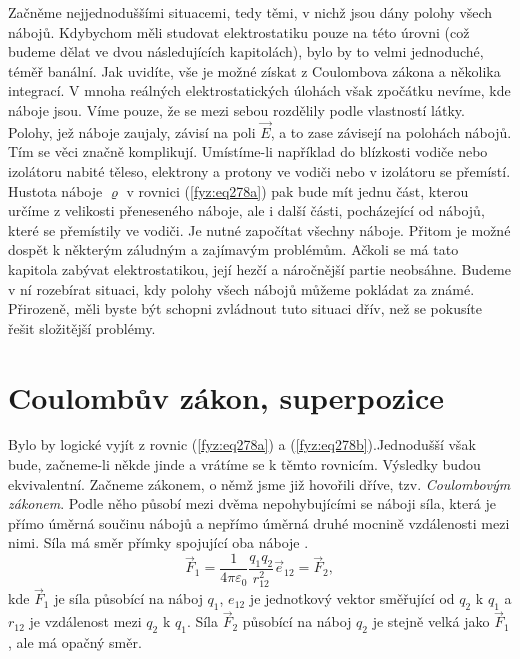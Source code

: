     Začněme nejjednoduššími situacemi, tedy těmi, v nichž jsou dány polohy všech nábojů. Kdybychom 
    měli studovat elektrostatiku pouze na této úrovni (což budeme dělat ve dvou následujících 
    kapitolách), bylo by to velmi jednoduché, téměř banální. Jak uvidíte, vše je možné získat z 
    Coulombova zákona a  několika integrací. V mnoha reálných elektrostatických úlohách však 
    zpočátku nevíme, kde náboje jsou. Víme pouze, že se mezi sebou rozdělily podle vlastností 
    látky. Polohy, jež náboje zaujaly, závisí na poli \(\vec{E}\), a to zase závisejí na polohách 
    nábojů. Tím se věci značně komplikují. Umístíme-li například do blízkosti vodiče nebo izolátoru 
    nabité těleso, elektrony a protony ve vodiči nebo v izolátoru se přemístí. Hustota náboje 
    \(\varrho\) v rovnici (\ref{fyz:eq278a}) pak bude mít jednu část, kterou určíme z 
    velikosti přeneseného náboje, ale i další části, pocházející od nábojů, které se přemístily ve 
    vodiči. Je nutné započítat všechny náboje. Přitom je možné dospět k některým záludným a 
    zajímavým problémům. Ačkoli se má tato kapitola zabývat elektrostatikou, její hezčí a 
    náročnější partie neobsáhne. Budeme v ní rozebírat situaci, kdy polohy všech nábojů můžeme 
    pokládat za známé. Přirozeně, měli byste být schopni zvládnout tuto situaci dřív, než se 
    pokusíte řešit složitější problémy.
    
  \section{Coulombův zákon, superpozice}\hypertarget{fyz:IIchapIVsecII}{}    
    Bylo by logické vyjít z rovnic (\ref{fyz:eq278a}) a (\ref{fyz:eq278b}).Jednodušší však bude,
    začneme-li někde jinde a vrátíme se k těmto rovnicím. Výsledky budou ekvivalentní. Začneme
    zákonem, o němž jsme již hovořili dříve, tzv. \emph{Coulombovým zákonem}. Podle něho působí mezi
    dvěma nepohybujícími se náboji síla, která je přímo úměrná součinu nábojů a nepřímo úměrná druhé
    mocnině vzdálenosti mezi nimi. Síla má směr přímky spojující oba náboje \cite[s.~65]{Feynman02}.
    \begin{equation}\label{fyz:eq279}
      \boxed{
        \vec{F}_1=\frac{1}{4\pi\varepsilon_0}\frac{q_1q_2}{r_{12}^2}\vec{e}_{12} = \vec{F}_2,
      }
    \end{equation}
    kde \(\vec{F}_1\) je síla působící na náboj \(q_1\), \(e_{12}\) je jednotkový vektor směřující 
    od \(q_2\) k \(q_1\) a \(r_{12}\) je vzdálenost mezi \(q_2\) k \(q_1\). Síla \(\vec{F}_2\) 
    působící na náboj \(q_2\) je stejně velká jako \(\vec{F}_1\), ale má opačný směr.
     
